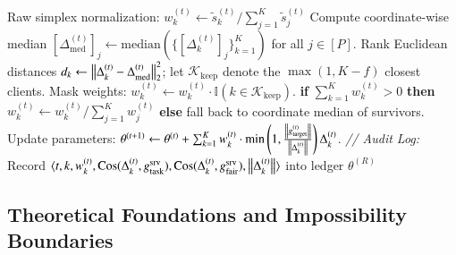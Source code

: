 \begin{algorithm}[t]
\begin{algorithmic}[1]
    \ENDFOR
    \STATE Raw simplex normalization: $w_k^{(t)} \gets \tilde{s}_k^{(t)} / \sum_{j=1}^K \tilde{s}_j^{(t)}$ 
        \STATE Compute coordinate-wise median $[\Delta_{\mathrm{med}}^{(t)}]_j \gets \mathrm{median}(\{[\Delta_k^{(t)}]_j\}_{k=1}^K)$ for all $j \in [P]$.
        \STATE Rank Euclidean distances $d_k \gets \left\lVert \Delta_k^{(t)} - \Delta_{\mathrm{med}}^{(t)} \right\rVert_2^2$; let $\mathcal{K}_{\mathrm{keep}}$ denote the $\max(1, K-f)$ closest clients.
        \STATE Mask weights: $w_k^{(t)} \gets w_k^{(t)} \cdot \mathbb{I}(k \in \mathcal{K}_{\mathrm{keep}})$.
        \STATE \textbf{if} $\sum_{k=1}^K w_k^{(t)} > 0$ \textbf{then} $w_k^{(t)} \gets w_k^{(t)} / \sum_{j=1}^K w_j^{(t)}$ \textbf{else} fall back to coordinate median of survivors.
    \ENDIF
    \STATE Update parameters: $\theta^{(t+1)} \gets \theta^{(t)} + \sum_{k=1}^K w_k^{(t)} \cdot \min\left(1, \frac{\left\lVert g_{\mathrm{target}}^{(t)} \right\rVert}{\left\lVert \Delta_k^{(t)} \right\rVert}\right) \Delta_k^{(t)}$.
    \STATE \textit{// Audit Log:} Record $\langle t, k, w_k^{(t)}, \operatorname{Cos}(\Delta_k^{(t)}, g_{\mathrm{task}}^{\mathrm{srv}}), \operatorname{Cos}(\Delta_k^{(t)}, g_{\mathrm{fair}}^{\mathrm{srv}}), \left\lVert \Delta_k^{(t)} \right\rVert \rangle$ into ledger 
\ENDFOR
\RETURN $\theta^{(R)}$
\end{algorithmic}
\end{algorithm}

\subsection{Theoretical Foundations and Impossibility Boundaries}
\label{subsec:theory}

